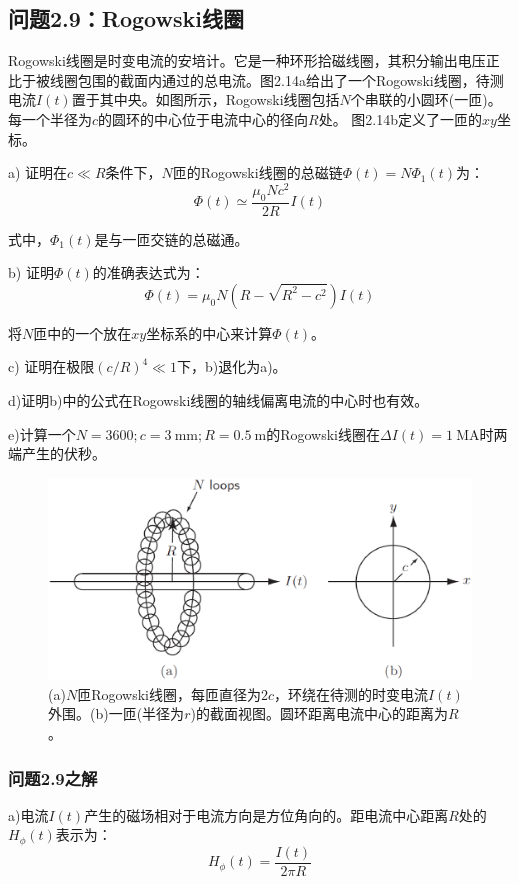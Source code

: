 \subsection{问题2.9：Rogowski线圈}
Rogowski线圈是时变电流的安培计。它是一种环形拾磁线圈，其积分输出电压正比于被线圈包围的截面内通过的总电流。图2.14a给出了一个Rogowski线圈，待测电流$I(t)$置于其中央。如图所示，Rogowski线圈包括$N$个串联的小圆环(一匝)。每一个半径为$c$的圆环的中心位于电流中心的径向$R$处。
图2.14b定义了一匝的$xy$坐标。

a) 证明在$c\ll R$条件下，$N$匝的Rogowski线圈的总磁链$\Phi(t)=N\Phi_1(t)$为：
\begin{equation}
\Phi(t)\simeq\frac{\mu_0 N c^2}{2R}I(t)
\end{equation}

式中，$\Phi_1(t)$是与一匝交链的总磁通。

b) 证明$\Phi(t)$的准确表达式为：
\begin{equation}
\Phi(t)=\mu_0 N (R-\sqrt{R^2-c^2})I(t)
\end{equation}

将$N$匝中的一个放在$xy$坐标系的中心来计算$\Phi(t)$。

c) 证明在极限$(c/R)^4\ll 1$下，b)退化为a)。

d)证明b)中的公式在Rogowski线圈的轴线偏离电流的中心时也有效。

e)计算一个$N = 3600; c = 3\ \mathrm{mm}; R = 0.5\ \mathrm{m}$的Rogowski线圈在$\Delta I(t)=1\ \mathrm{MA}$时两端产生的伏秒。

\begin{figure}[htbp]
  \centering
 \includegraphics[scale=0.4]{chpt2/figs/fig2.14.eps}
  \caption{(a)$N$匝Rogowski线圈，每匝直径为$2c$，环绕在待测的时变电流$I(t)$外围。(b)一匝(半径为$r$)的截面视图。圆环距离电流中心的距离为$R$。}
\end{figure}

\subsubsection{问题2.9之解}
a)电流$I(t)$产生的磁场相对于电流方向是方位角向的。距电流中心距离$R$处的$H_\phi(t)$表示为：
\begin{equation*}
H_\phi (t)=\frac{I(t)}{2\pi R} \tag{S9.1}
\end{equation*}

